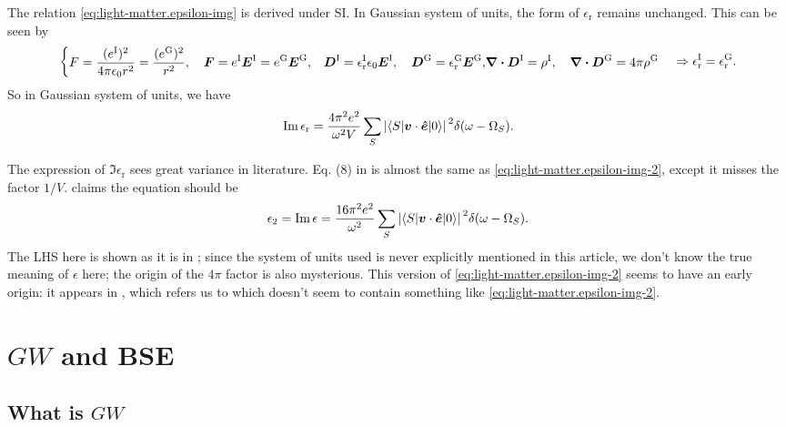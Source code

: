\documentclass[hyperref, a4paper]{report}
\def\\{}%
\newcommand*{\epsr}{\epsilon_{\text{r}}}
\begin{document}
The relation \eqref{eq:light-matter.epsilon-img} is derived under SI. 
In Gaussian system of units, 
the form of $\epsr$ remains unchanged. 
This can be seen by 
\[
    \left\{
        \begin{aligned}
            &F = \frac{(e^{\text{I}})^2}{4 \pi \epsilon_0 r^2} = \frac{(e^{\text{G}})^2}{r^2}, \quad 
            \vb*{F} = e^{\text{I}} \vb*{E}^{\text{I}} 
            = e^{\text{G}} \vb*{E}^{\text{G}}, \\
            &\vb*{D}^{\text{I}} = \epsr^{\text{I}} \epsilon_0 \vb*{E}^{\text{I}}, \quad 
            \vb*{D}^{\text{G}} = \epsr^{\text{G}} \vb*{E}^{\text{G}}, \\
            &\div{\vb*{D}}^{\text{I}} = \rho^{\text{I}}, \quad 
            \div{\vb*{D}}^{\text{G}} = 4\pi \rho^{\text{G}}
        \end{aligned}
    \right. \Rightarrow
    \epsr^{\text{I}} = \epsr^{\text{G}}.
\]
So in Gaussian system of units, 
we have 
\begin{equation}
    \Im \epsr = \frac{4 \pi^2 e^2}{\omega^2  V} 
        \sum_S \abs*{\mel**{S}{\vb*{v} \cdot \vu*{e}}{0}}^2 \delta(\omega - \Omega_S).
    \label{eq:light-matter.epsilon-img-2}
\end{equation}

The expression of $\Im \epsr$ sees great variance in literature. 
Eq. (8) in \cite{del1993optical} is almost the same as \eqref{eq:light-matter.epsilon-img-2},
except it misses the factor $1 / V$. 
\cite{berkeleygw} claims the equation should be 
\[
    \epsilon_2 = \Im \epsilon = \frac{16 \pi^2 e^2}{\omega^2 } 
    \sum_S \abs*{\mel**{S}{\vb*{v} \cdot \vu*{e}}{0}}^2 \delta(\omega - \Omega_S).
\]
The LHS here is shown as it is in \cite{berkeleygw}; 
since the system of units used is never explicitly mentioned in this article, 
we don't know the true meaning of $\epsilon$ here;
the origin of the $4\pi$ factor is also mysterious.
This version of \eqref{eq:light-matter.epsilon-img-2} seems to have an early origin:
it appears in \cite{rohlfing2000electron},
which refers us to \cite{adolph1996nonlocality}
which doesn't seem to contain something like \eqref{eq:light-matter.epsilon-img-2}.

\chapter{$GW$ and BSE}

\section{What is $GW$}
\end{document}
